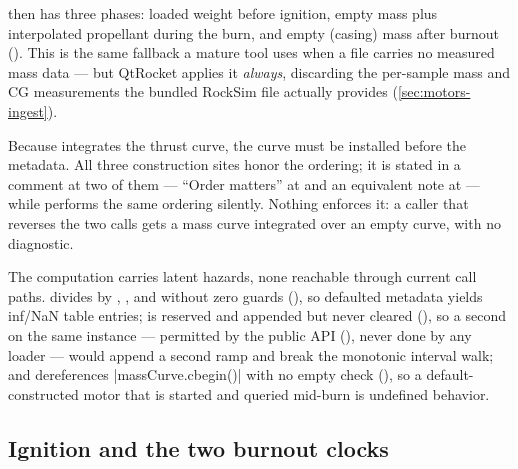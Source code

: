  then has three phases: loaded weight before ignition, empty mass plus
interpolated propellant during the burn, and empty (casing) mass after burnout
(). This is the same fallback a mature tool uses when a file carries
no measured mass data --- but QtRocket applies it \emph{always}, discarding the per-sample mass and
CG measurements the bundled RockSim file actually provides (\cref{sec:motors-ingest}).

\begin{designrule}
Because  integrates the thrust curve, the curve must be installed before
the metadata. All three construction sites honor the ordering; it is stated in a comment at two of
them --- ``Order matters'' at  and an equivalent note at
 --- while  performs the
same ordering silently. Nothing enforces it: a caller that reverses the two calls gets a mass curve
integrated over an empty curve, with no diagnostic.
\end{designrule}

The computation carries latent hazards, none reachable through current call paths.
 divides by , , and 
without zero guards (), so defaulted metadata yields inf/NaN table
entries;  is reserved and appended but never cleared
(), so a second  on the same instance ---
permitted by the public API (), never done by any loader --- would
append a second ramp and break the monotonic interval walk; and  dereferences
\cppinline|massCurve.cbegin()| with no empty check (), so a
default-constructed motor that is started and queried mid-burn is undefined behavior.

\subsection{Ignition and the two burnout clocks}\label{sec:motors-clocks}

